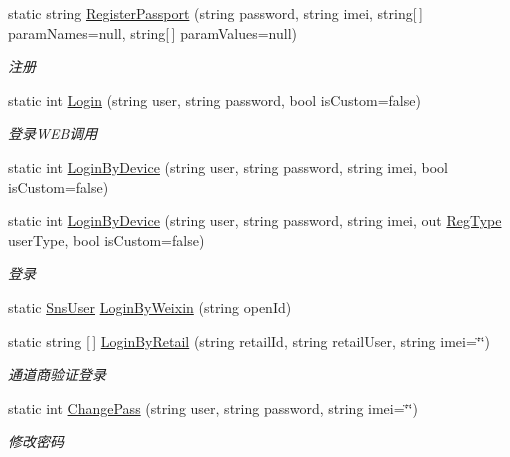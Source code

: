 \begin{DoxyCompactItemize}
\item 
static string \mbox{\hyperlink{class_t_net_1_1_sns_1_1_sns_manager_ad57fcb3381e2a5a0c51d0a7c0490ed1e}{Register\+Passport}} (string password, string imei, string\mbox{[}$\,$\mbox{]} param\+Names=null, string\mbox{[}$\,$\mbox{]} param\+Values=null)
\begin{DoxyCompactList}\small\item\em 注册 \end{DoxyCompactList}\item 
static int \mbox{\hyperlink{class_t_net_1_1_sns_1_1_sns_manager_a66c9e1d69383f0c9234ca342d6a0f7aa}{Login}} (string user, string password, bool is\+Custom=false)
\begin{DoxyCompactList}\small\item\em 登录\+W\+E\+B调用 \end{DoxyCompactList}\item 
static int \mbox{\hyperlink{class_t_net_1_1_sns_1_1_sns_manager_a7fb3467cf9b1dae456671690b7706659}{Login\+By\+Device}} (string user, string password, string imei, bool is\+Custom=false)
\item 
static int \mbox{\hyperlink{class_t_net_1_1_sns_1_1_sns_manager_a09d21791af1b07f84d46faa4aaf0a8b1}{Login\+By\+Device}} (string user, string password, string imei, out \mbox{\hyperlink{namespace_t_net_1_1_sns_a338402ea3c5dbc36f95f0a7e4c1cd3a2}{Reg\+Type}} user\+Type, bool is\+Custom=false)
\begin{DoxyCompactList}\small\item\em 登录 \end{DoxyCompactList}\item 
static \mbox{\hyperlink{class_t_net_1_1_sns_1_1_sns_user}{Sns\+User}} \mbox{\hyperlink{class_t_net_1_1_sns_1_1_sns_manager_a162cafb3af0c97584368ff67531e3a78}{Login\+By\+Weixin}} (string open\+Id)
\item 
static string \mbox{[}$\,$\mbox{]} \mbox{\hyperlink{class_t_net_1_1_sns_1_1_sns_manager_afd8c2b14a0748d363f9d2d1e2bdca40f}{Login\+By\+Retail}} (string retail\+Id, string retail\+User, string imei=\char`\"{}\char`\"{})
\begin{DoxyCompactList}\small\item\em 通道商验证登录 \end{DoxyCompactList}\item 
static int \mbox{\hyperlink{class_t_net_1_1_sns_1_1_sns_manager_a217ffada63ad62adf154cbad1a630e23}{Change\+Pass}} (string user, string password, string imei=\char`\"{}\char`\"{})
\begin{DoxyCompactList}\small\item\em 修改密码 \end{DoxyCompactList}\item 

\end{DoxyCompactItemize}
